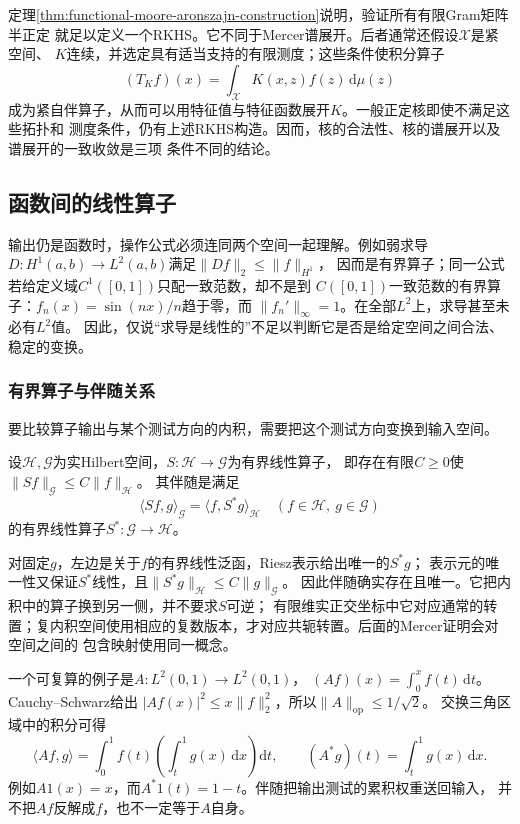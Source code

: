 定理\ref{thm:functional-moore-aronszajn-construction}说明，验证所有有限Gram矩阵半正定
就足以定义一个RKHS。它不同于Mercer谱展开。后者通常还假设$\mathcal{X}$是紧空间、
$K$连续，并选定具有适当支持的有限测度；这些条件使积分算子
\[
  (T_Kf)(x)
  =
  \int_{\mathcal{X}}K(x,z)f(z)\,\mathrm{d}\mu(z)
\]
成为紧自伴算子，从而可以用特征值与特征函数展开$K$。一般正定核即使不满足这些拓扑和
测度条件，仍有上述RKHS构造。因而，核的合法性、核的谱展开以及谱展开的一致收敛是三项
条件不同的结论。


\subsection{函数间的线性算子}

输出仍是函数时，操作公式必须连同两个空间一起理解。例如弱求导
$D:H^1(a,b)\to L^2(a,b)$满足$\lVert Df\rVert_2\leq\lVert f\rVert_{H^1}$，
因而是有界算子；同一公式若给定义域$C^1([0,1])$只配一致范数，却不是到
$C([0,1])$一致范数的有界算子：$f_n(x)=\sin(nx)/n$趋于零，而
$\lVert f_n'\rVert_\infty=1$。在全部$L^2$上，求导甚至未必有$L^2$值。
因此，仅说“求导是线性的”不足以判断它是否是给定空间之间合法、稳定的变换。

\subsubsection{有界算子与伴随关系}

要比较算子输出与某个测试方向的内积，需要把这个测试方向变换到输入空间。
\begin{definition}[Hilbert空间之间的伴随算子]
\label{def:functional-adjoint}
设$\mathcal H,\mathcal G$为实Hilbert空间，$S:\mathcal H\to\mathcal G$为有界线性算子，
即存在有限$C\geq0$使$\lVert Sf\rVert_{\mathcal G}\leq C\lVert f\rVert_{\mathcal H}$。
其伴随是满足
\[
 \langle Sf,g\rangle_{\mathcal G}
 =\langle f,S^*g\rangle_{\mathcal H}
 \quad(f\in\mathcal H,\ g\in\mathcal G)
\]
的有界线性算子$S^*:\mathcal G\to\mathcal H$。
\end{definition}
对固定$g$，左边是关于$f$的有界线性泛函，Riesz表示给出唯一的$S^*g$；
表示元的唯一性又保证$S^*$线性，且$\lVert S^*g\rVert_{\mathcal H}\leq C\lVert g\rVert_{\mathcal G}$。
因此伴随确实存在且唯一。它把内积中的算子换到另一侧，并不要求$S$可逆；
有限维实正交坐标中它对应通常的转置；复内积空间使用相应的复数版本，才对应共轭转置。后面的Mercer证明会对空间之间的
包含映射使用同一概念。

一个可复算的例子是$A:L^2(0,1)\to L^2(0,1)$，
$(Af)(x)=\int_0^x f(t)\,\mathrm dt$。Cauchy--Schwarz给出
$|Af(x)|^2\leq x\lVert f\rVert_2^2$，所以$\lVert A\rVert_{\mathrm{op}}\leq1/\sqrt2$。
交换三角区域中的积分可得
\[
 \langle Af,g\rangle
 =\int_0^1 f(t)\left(\int_t^1g(x)\,\mathrm dx\right)\mathrm dt,\qquad
 (A^*g)(t)=\int_t^1g(x)\,\mathrm dx.
\]
例如$A1(x)=x$，而$A^*1(t)=1-t$。伴随把输出测试的累积权重送回输入，
并不把$Af$反解成$f$，也不一定等于$A$自身。

